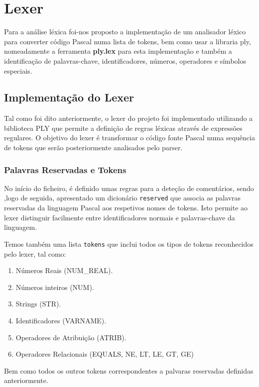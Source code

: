 \chapter{Lexer}

Para a análise léxica foi-nos proposto a implementação de um analisador léxico para converter código Pascal numa lista de tokens, bem como usar a libraria ply, nomeadamente a ferramenta \textbf{ply.lex} para esta implementação e também a identificação de palavras-chave, identificadores, números, operadores e símbolos especiais.

\section{Implementação do Lexer}

Tal como foi dito anteriormente, o lexer do projeto foi implementado utilizando a biblioteca PLY que permite a definição de regras léxicas através de expressões regulares. O objetivo do lexer é transformar o código fonte Pascal numa sequência de tokens que serão posteriormente analisados pelo parser.

\subsection{Palavras Reservadas e Tokens}

No início do ficheiro, é definido umas regras para a deteção de comentários, sendo ,logo de seguida, apresentado um dicionário \texttt{reserved} que associa as palavras reservadas da linguagem Pascal aos respetivos nomes de tokens. Isto permite ao lexer distinguir facilmente entre identificadores normais e palavras-chave da linguagem.

Temos também uma lista \texttt{tokens} que inclui todos os tipos de tokens reconhecidos pelo lexer, tal como:
\begin{enumerate}
    \item Números Reais (NUM\_REAL).
    \item Números inteiros (NUM).
    \item Strings (STR).
    \item Identificadores (VARNAME).
    \item Operadores de Atribuição (ATRIB).
    \item Operadores Relacionais (EQUALS, NE, LT, LE, GT, GE)
\end{enumerate}

Bem como todos os outros tokens correspondentes a palvaras reservadas definidas anteriormente.

